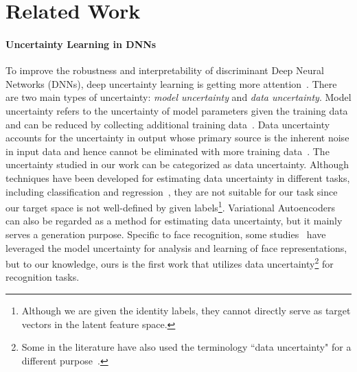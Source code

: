 \documentclass[10pt,twocolumn,letterpaper]{article}
\begin{document}
\section{Related Work}

\paragraph{Uncertainty Learning in DNNs}
To improve the robustness and interpretability of discriminant Deep Neural Networks (DNNs), deep uncertainty learning is getting more attention~\cite{kendall2015bayesian,gal2016dropout,kendall2017uncertainties}. There are two main types of uncertainty: \textit{model uncertainty} and \textit{data uncertainty}. Model uncertainty refers to the uncertainty of model parameters given the training data and can be reduced by collecting additional training data~\cite{mackay1992practical,neal1995bayesian,kendall2015bayesian,gal2016dropout}. Data uncertainty accounts for the uncertainty in output whose primary source is the inherent noise in input data and hence cannot be eliminated with more training data~\cite{kendall2017uncertainties}. The uncertainty studied in our work can be categorized as data uncertainty. Although techniques have been developed for estimating data uncertainty in different tasks, including classification and regression~\cite{kendall2017uncertainties}, they are not suitable for our task since our target space is not well-defined by given labels\footnote{Although we are given the identity labels, they cannot directly serve as target vectors in the latent feature space.}. Variational Autoencoders~\cite{kingma2013auto} can also be regarded as a method for estimating data uncertainty, but it mainly serves a generation purpose. Specific to face recognition, some studies~\cite{gong2017capacity,khan2019striking,zafar2019face} have leveraged the model uncertainty for analysis and learning of face representations, but to our knowledge, ours is the first work that utilizes data uncertainty\footnote{Some in the literature have also used the terminology ``data uncertainty" for a different purpose~\cite{xu2014data}.} for recognition tasks.
\end{document}
